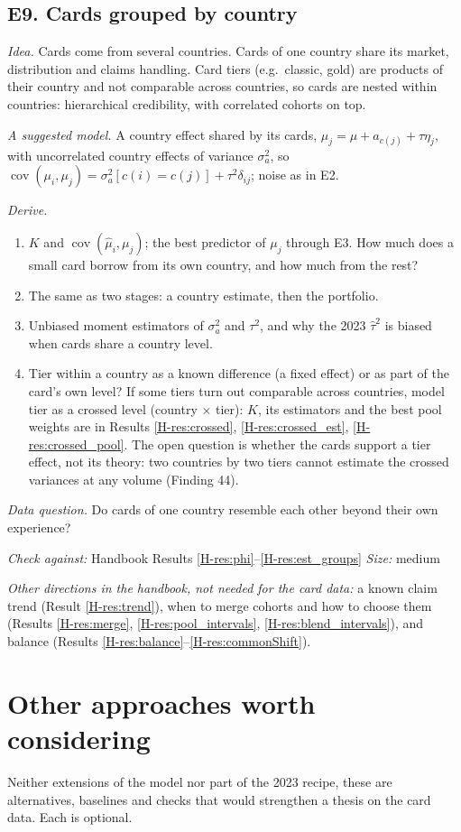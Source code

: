 \documentclass[10pt]{article}
\newcommand{\hb}[1]{\ref*{H-#1}}
\newcommand{\hmu}{\hat\mu}
\newcommand{\cov}{\operatorname{cov}}
\newcommand{\ext}[7]{%
  \subsection*{#1}
  \textit{Idea.} #2\par\smallskip
  \textit{A suggested model.} #3\par\smallskip
  \textit{Derive.}
  \begin{enumerate}\setlength{\itemsep}{1pt}\setlength{\parskip}{0pt}#4\end{enumerate}
  \textit{Data question.} #5\par\smallskip
  {\small\textit{Check against:} Handbook #6 \quad\textperiodcentered\quad \textit{Size:} #7}\par}
\begin{document}
\ext{E9. Cards grouped by country}
{Cards come from several countries. Cards of one country share its market, distribution and claims
handling. Card tiers (e.g.\ classic, gold) are products of their country and not comparable across
countries, so cards are nested within countries: hierarchical credibility, with correlated cohorts
on top.}
{A country effect shared by its cards, $\mu_j = \mu + a_{c(j)} + \tau\eta_j$, with uncorrelated
country effects of variance $\sigma_a^2$, so
$\cov(\mu_i, \mu_j) = \sigma_a^2[c(i) = c(j)] + \tau^2\delta_{ij}$; noise as in E2.}
{\item $K$ and $\cov(\hmu_i, \mu_j)$; the best predictor of $\mu_j$ through E3. How much does a
   small card borrow from its own country, and how much from the rest?
 \item The same as two stages: a country estimate, then the portfolio.
 \item Unbiased moment estimators of $\sigma_a^2$ and $\tau^2$, and why the 2023 $\hat\tau^2$ is
   biased when cards share a country level.
 \item Tier within a country as a known difference (a fixed effect) or as part of the card's own
   level? If some tiers turn out comparable across countries, model tier as a crossed level
   (country $\times$ tier): $K$, its estimators and the best pool weights are in Results
   \hb{res:crossed}, \hb{res:crossed_est}, \hb{res:crossed_pool}. The open question is whether
   the cards support a tier effect, not its theory: two countries by two tiers cannot estimate
   the crossed variances at any volume (Finding 44).}
{Do cards of one country resemble each other beyond their own experience?}
{Results \hb{res:phi}--\hb{res:est_groups}}{medium}

\medskip
\textit{Other directions in the handbook, not needed for the card data:} a known claim trend
(Result \hb{res:trend}), when to merge cohorts and how to choose them (Results \hb{res:merge},
\hb{res:pool_intervals}, \hb{res:blend_intervals}), and balance (Results \hb{res:balance}--\hb{res:commonShift}).

\section{Other approaches worth considering}\label{sec:other}

Neither extensions of the model nor part of the 2023 recipe, these are alternatives, baselines and
checks that would strengthen a thesis on the card data. Each is optional.
\end{document}
